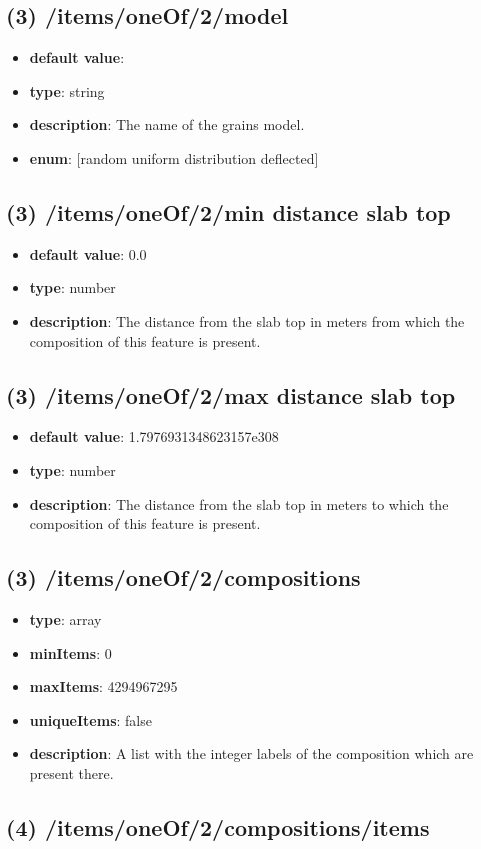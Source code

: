 \subsection{(3) /items/oneOf/2/model}
\begin{itemize}[leftmargin=3em]\item {\bf default value}: 
\item {\bf type}: string
\item {\bf description}: The name of the grains model.
\item {\bf enum}: [random uniform distribution deflected]\end{itemize}\subsection{(3) /items/oneOf/2/min distance slab top}
\begin{itemize}[leftmargin=3em]\item {\bf default value}: 0.0
\item {\bf type}: number
\item {\bf description}: The distance from the slab top in meters from which the composition of this feature is present.
\end{itemize}\subsection{(3) /items/oneOf/2/max distance slab top}
\begin{itemize}[leftmargin=3em]\item {\bf default value}: 1.7976931348623157e308
\item {\bf type}: number
\item {\bf description}: The distance from the slab top in meters to which the composition of this feature is present.
\end{itemize}\subsection{(3) /items/oneOf/2/compositions}
\begin{itemize}[leftmargin=3em]\item {\bf type}: array
\item {\bf minItems}: 0
\item {\bf maxItems}: 4294967295
\item {\bf uniqueItems}: false
\item {\bf description}: A list with the integer labels of the composition which are present there.
\end{itemize}\subsection{(4) /items/oneOf/2/compositions/items}
